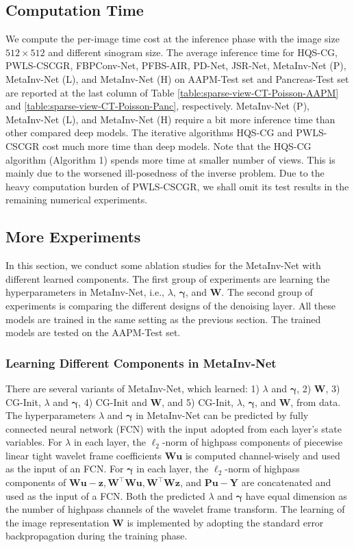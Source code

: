 \documentclass[journal,twoside]{IEEEtran}
\begin{document}
\subsection{Computation Time}
We compute the per-image time cost at the inference phase with the image size $512\times 512$ and different sinogram size. The average inference time for HQS-CG, PWLS-CSCGR, FBPConv-Net, PFBS-AIR, PD-Net, JSR-Net, MetaInv-Net (P), MetaInv-Net (L), and MetaInv-Net (H) on AAPM-Test set and Pancreas-Test set are reported at the last column of Table \ref{table:sparse-view-CT-Poisson-AAPM} and \ref{table:sparse-view-CT-Poisson-Panc}, respectively. MetaInv-Net (P), MetaInv-Net (L), and MetaInv-Net (H) require a bit more inference time than other compared deep models. The iterative algorithms HQS-CG and PWLS-CSCGR cost much more time than deep models. Note that the HQS-CG algorithm (Algorithm 1) spends more time at smaller number of views. This is mainly due to the worsened ill-posedness of the inverse problem. Due to the heavy computation burden of PWLS-CSCGR, we shall omit its test results in the remaining numerical experiments.


\subsection{More Experiments}
In this section, we conduct some ablation studies for the MetaInv-Net with different learned components. The first group of experiments are learning the hyperparameters in MetaInv-Net, i.e., $\lambda$, $\bm{\gamma}$, and $\bm{W}$. 
The second group of experiments is comparing the different designs of the denoising layer. 
All these models are trained in the same setting as the previous section. The trained models are tested on the AAPM-Test set.


\subsubsection{Learning Different Components in MetaInv-Net}
There are several variants of MetaInv-Net, which learned: 1) $\lambda$ and $\bm{\gamma}$, 2) $\bm{W}$, 3) CG-Init, $\lambda$ and $\bm{\gamma}$, 4) CG-Init and $\bm{W}$, and 5) CG-Init, $\lambda$, $\bm{\gamma}$, and $\bm{W}$, from data. The hyperparameters $\lambda$ and $\bm{\gamma}$ in MetaInv-Net can be predicted by fully connected neural network (FCN) with the input adopted from each layer's state variables. For $\lambda$ in each layer, the $\ell_{2}$-norm of highpass components of piecewise linear tight wavelet frame coefficients $\bm{W}\bm{u}$ is computed channel-wisely and used as the input of an FCN. For $\bm{\gamma}$ in each layer, the $\ell_{2}$-norm of highpass components of $\bm{W}\bm{u}-\bm{z}, \bm{W}^{\top}\bm{W}\bm{u}, \bm{W}^{\top}\bm{W}\bm{z}$, and $\bm{P}\bm{u}-\bm{Y}$ are concatenated and used as the input of a FCN. Both the predicted  $\lambda$ and $\bm{\gamma}$ have equal dimension as the number of highpass channels of the wavelet frame transform. The learning of the image representation $\bm{W}$ is implemented by adopting the standard error backpropagation during the training phase. 
\end{document}

